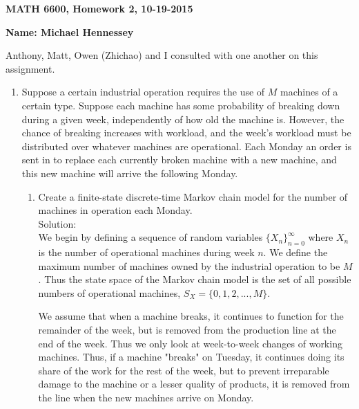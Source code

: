 \documentclass[12pt]{article}
\numberwithin{equation}{section}
\begin{document}
{\large\bf MATH 6600, Homework 2, 10-19-2015}

\vspace{6 ex}

{\bf Name: Michael Hennessey} \hfill

\vspace{6 ex}

Anthony, Matt, Owen (Zhichao) and I consulted with one another on this assignment.

\begin{enumerate}

\item Suppose a certain industrial operation requires the use of $M$ machines of a certain type. Suppose each machine has some probability of breaking down during a given week, independently of how old the machine is. However, the chance of breaking increases with workload, and the week's workload must be distributed over whatever machines are operational. Each Monday an order is sent in to replace each currently broken machine with a new machine, and this new machine will arrive the following Monday.
    \begin{enumerate}
        \item Create a finite-state discrete-time Markov chain model for the number of machines in operation each Monday.\\

            Solution:\\

            We begin by defining a sequence of random variables $\{X_n\}_{n=0}^\infty$ where $X_n$ is the number of operational machines during week $n$. We define the maximum number of machines owned by the industrial operation to be $M$. Thus the state space of the Markov chain model is the set of all possible numbers of operational machines, $S_X=\{0,1,2,...,M\}.$

            We assume that when a machine breaks, it continues to function for the remainder of the week, but is removed from the production line at the end of the week. Thus we only look at week-to-week changes of working machines. Thus, if a machine "breaks" on Tuesday, it continues doing its share of the work for the rest of the week, but to prevent irreparable damage to the machine or a lesser quality of products, it is removed from the line when the new machines arrive on Monday.


\end{enumerate}
\end{enumerate}
\end{document}
